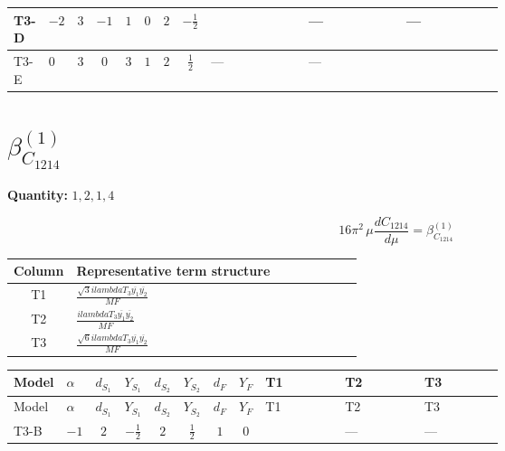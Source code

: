 \documentclass[8pt]{article}
\begin{document}
\begin{landscape}
\begin{longtable}{@{}llcccccc >{\raggedright\arraybackslash}p{0.21\linewidth} >{\raggedright\arraybackslash}p{0.21\linewidth} >{\raggedright\arraybackslash}p{0.21\linewidth}@{}}
\midrule
T3-D & $-2$ & $3$ & $-1$ & $1$ & $0$ & $2$ & $-\frac{1}{2}$ & \scriptsize\adjustbox{max width=\linewidth}{$\begin{gathered} - \frac{\sqrt{3} lambdaT_{3} \overline{y_{1}} \overline{y_{2}}}{3 MF}\end{gathered}$} & --- & --- \\
\midrule
T3-E & $0$ & $3$ & $0$ & $3$ & $1$ & $2$ & $\frac{1}{2}$ & --- & --- & \scriptsize\adjustbox{max width=\linewidth}{$\begin{gathered} \frac{\sqrt{6} lambdaT_{3} \overline{y_{1}} \overline{y_{2}}}{3 MF}\end{gathered}$} \\
\midrule
\bottomrule
\end{longtable}
\clearpage
\section*{$\beta_{C_{1214}}^{(1)}$}
\noindent\textbf{Quantity: }$\mathrm{1,2,1,4}$\par\smallskip
\[16\pi^2\,\mu\frac{d C_{1214}}{d\mu}=\beta_{C_{1214}}^{(1)}\]
\begin{center}
\begin{tabular}{@{}c >{\raggedright\arraybackslash}p{0.82\linewidth}@{}}
\toprule
Column & Representative term structure \\
\midrule
T1 & \(\displaystyle \frac{\sqrt{3} i lambdaT_{3} \overline{y_{1}} \overline{y_{2}}}{MF}\) \\
\midrule
T2 & \(\displaystyle \frac{i lambdaT_{3} \overline{y_{1}} \overline{y_{2}}}{MF}\) \\
\midrule
T3 & \(\displaystyle \frac{\sqrt{6} i lambdaT_{3} \overline{y_{1}} \overline{y_{2}}}{MF}\) \\
\midrule
\bottomrule
\end{tabular}
\end{center}
\smallskip
\tiny
\begin{longtable}{@{}llcccccc >{\raggedright\arraybackslash}p{0.21\linewidth} >{\raggedright\arraybackslash}p{0.21\linewidth} >{\raggedright\arraybackslash}p{0.21\linewidth}@{}}
\toprule
Model & $\alpha$ & $d_{S_1}$ & $Y_{S_1}$ & $d_{S_2}$ & $Y_{S_2}$ & $d_F$ & $Y_F$ & T1 & T2 & T3 \\
\midrule
\endfirsthead
\toprule
Model & $\alpha$ & $d_{S_1}$ & $Y_{S_1}$ & $d_{S_2}$ & $Y_{S_2}$ & $d_F$ & $Y_F$ & T1 & T2 & T3 \\
\midrule
\endhead
T3-B & $-1$ & $2$ & $-\frac{1}{2}$ & $2$ & $\frac{1}{2}$ & $1$ & $0$ & \scriptsize\adjustbox{max width=\linewidth}{$\begin{gathered} - \frac{\sqrt{3} i lambdaT_{3} \overline{y_{1}} \overline{y_{2}}}{3 MF}\end{gathered}$} & --- & --- \\

\end{longtable}
\end{landscape}
\end{document}
